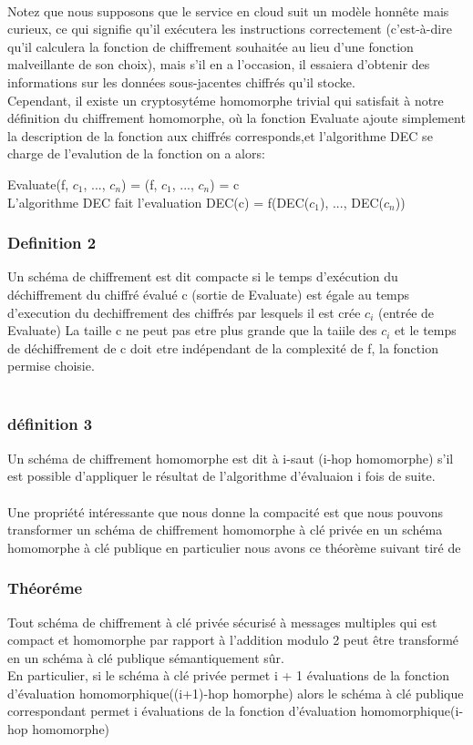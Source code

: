 \\
Notez que nous supposons que le service en cloud  suit un modèle honnête mais curieux, ce qui signifie qu'il exécutera les instructions correctement (c'est-à-dire qu'il calculera la fonction de chiffrement souhaitée au lieu d'une fonction malveillante de son choix), mais s'il en a l'occasion, il essaiera  d'obtenir des informations sur les données sous-jacentes chiffrés qu'il stocke.
\\
Cependant, il existe un cryptosytéme homomorphe trivial qui satisfait à notre définition du chiffrement homomorphe, où la fonction Evaluate ajoute simplement la description de la fonction aux chiffrés corresponds,et l'algorithme DEC se charge de l'evalution de la fonction on  a alors:
\begin{center}
  Evaluate(f, $c{_1}$, ..., $c{_n}$) = (f, $c{_1}$, ..., $c{_n}$) = c \\ L'algorithme DEC fait l'evaluation
  DEC(c) = f(DEC($c{_1}$), ..., DEC($c{_n}$))
\end{center}
\subsubsection{Definition 2}
Un schéma de chiffrement est dit compacte  si le temps d'exécution du déchiffrement du  chiffré évalué c (sortie de Evaluate) est égale au temps d'execution  du dechiffrement des chiffrés par lesquels il est crée  $c{_i}$ (entrée de Evaluate)
La taille c ne peut pas etre plus grande que la taiile des  $c{_i}$  et le temps de déchiffrement de c doit etre indépendant de la complexité de f, la fonction permise choisie.
\\
\\

\subsubsection{définition 3}
Un schéma de chiffrement homomorphe est dit à i-saut (i-hop homomorphe) s'il est possible d'appliquer le résultat de l'algorithme  d'évaluaion i fois de suite.
\\
\\
Une propriété intéressante que nous donne la compacité est que nous pouvons transformer un schéma de chiffrement homomorphe à clé privée en un schéma homomorphe à clé publique en particulier nous avons ce théorème suivant tiré de\cite{4}
\subsubsection{Théoréme }
Tout schéma de chiffrement à clé privée sécurisé à messages multiples qui est compact et homomorphe par rapport à l'addition modulo 2 peut être transformé en un schéma à clé publique sémantiquement sûr. \\En particulier, si le schéma à clé privée permet i + 1 évaluations de la fonction d'évaluation homomorphique((i+1)-hop homorphe)
alors le schéma à clé publique correspondant permet i évaluations de la fonction d'évaluation homomorphique(i-hop homomorphe)

